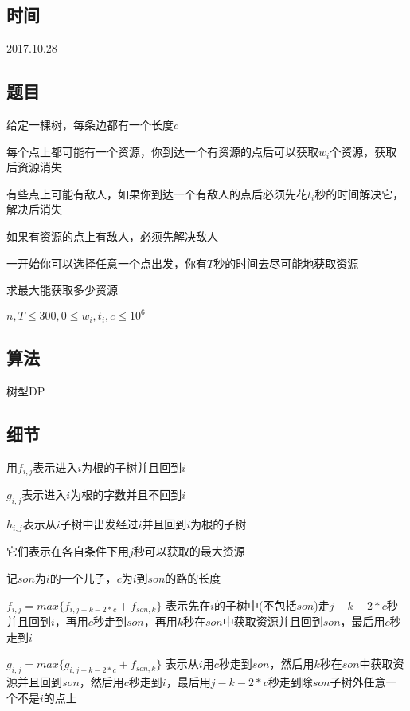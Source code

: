 \documentclass[a4paper]{article}
\begin{document}
	\subsection{时间}
		
		2017.10.28
		
	\subsection{题目}
		
		给定一棵树，每条边都有一个长度$c$
		
		每个点上都可能有一个资源，你到达一个有资源的点后可以获取$w_i$个资源，获取后资源消失
		
		有些点上可能有敌人，如果你到达一个有敌人的点后必须先花$t_i$秒的时间解决它，解决后消失
		
		如果有资源的点上有敌人，必须先解决敌人
		
		一开始你可以选择任意一个点出发，你有$T$秒的时间去尽可能地获取资源
		
		求最大能获取多少资源
		
		$n, T \leq 300,0\leq w_i, t_i, c \leq 10^6$
		
		
	\subsection{算法}
		
		树型DP
		
	\subsection{细节}
		
		用$f_{i,j}$表示进入$i$为根的子树并且回到$i$
		
		$g_{i,j}$表示进入$i$为根的字数并且不回到$i$
		
		$h_{i,j}$表示从$i$子树中出发经过$i$并且回到$i$为根的子树
		
		它们表示在各自条件下用$j$秒可以获取的最大资源
		
		记$son$为$i$的一个儿子，$c$为$i$到$son$的路的长度
		
		$f_{i,j} = max\{ f_{i, j - k - 2 * c} + f_{son,k} \}$
		表示先在$i$的子树中(不包括$son$)走$j - k - 2 * c$秒并且回到$i$，再用$c$秒走到$son$，再用$k$秒在$son$中获取资源并且回到$son$，最后用$c$秒走到$i$
		
		$g_{i,j} = max\{ g_{i, j - k - 2 * c} + f_{son,k} \}$
		表示从$i$用$c$秒走到$son$，然后用$k$秒在$son$中获取资源并且回到$son$，然后用$c$秒走到$i$，最后用$j - k - 2 * c$秒走到除$son$子树外任意一个不是$i$的点上
		
\end{document}
